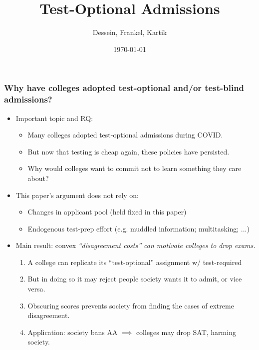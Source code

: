 \documentclass[11pt, aspectratio=169]{beamer}
\theoremstyle{plain}
\theoremstyle{plain}
\theoremstyle{plain}
\theoremstyle{plain}
\begin{document}
\title[]{Test-Optional Admissions}
\author[]{Dessein, Frankel, Kartik}
\date{\today}
\maketitle

\begin{frame}\frametitle{Why have colleges adopted test-optional and/or test-blind admissions?}
    \pause
    \begin{itemize}
        \item Important topic and RQ: \pause
            \begin{itemize}
                \item Many colleges adopted test-optional admissions during COVID. \pause
                \item But now that testing is cheap again, these policies have persisted. \pause
                \item Why would colleges want to commit not to learn something they care about? \pause
            \end{itemize}
            \item This paper's argument does not rely on: \pause
            \begin{itemize}
                \item Changes in applicant pool (held fixed in this paper) \pause
                \item Endogenous test-prep effort (e.g. muddled information; multitasking; ...) \pause
            \end{itemize}
        \item Main result: convex \emph{``disagreement costs'' can motivate colleges to drop exams.} \pause
        \begin{enumerate}
            \item A college can replicate its ``test-optional'' assignment w/ test-required \pause %
            \item But in doing so it may reject people society wants it to admit, or vice versa. \pause
            \item Obscuring scores prevents society from finding the cases of extreme disagreement. \pause
            \item Application: society bans AA $\implies$ colleges may drop SAT, harming society.
        \end{enumerate}
    \end{itemize}
\end{frame}
\end{document}
